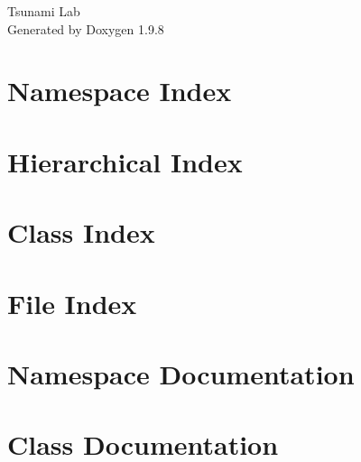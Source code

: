\documentclass[twoside]{book}
\newcommand{\+}{\discretionary{\mbox{\scriptsize$\hookleftarrow$}}{}{}}
\newcommand{\clearemptydoublepage}{%
    \newpage{\pagestyle{empty}\cleardoublepage}%
  }
\begin{document}
  \raggedbottom
    \hypersetup{pageanchor=false,
                bookmarksnumbered=true,
                pdfencoding=unicode
               }
  \begin{titlepage}
  \vspace*{7cm}
  \begin{center}%
  {\Large Tsunami Lab}\\
  \vspace*{1cm}
  {\large Generated by Doxygen 1.9.8}\\
  \end{center}
  \end{titlepage}
  \clearemptydoublepage
  \tableofcontents
  \clearemptydoublepage
  \hypersetup{pageanchor=true}
\chapter{Namespace Index}

\chapter{Hierarchical Index}

\chapter{Class Index}

\chapter{File Index}

\chapter{Namespace Documentation}

\chapter{Class Documentation}











\end{document}
